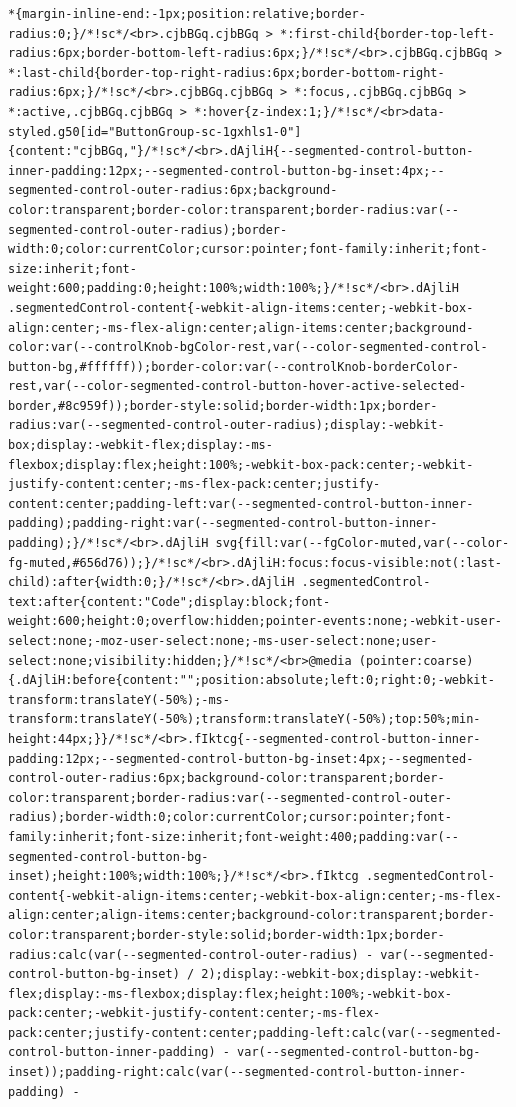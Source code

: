 \documentclass[
  letterpaper,
]{book}
\begin{document}
\begin{verbatim}
*{margin-inline-end:-1px;position:relative;border-radius:0;}/*!sc*/<br>.cjbBGq.cjbBGq > *:first-child{border-top-left-radius:6px;border-bottom-left-radius:6px;}/*!sc*/<br>.cjbBGq.cjbBGq > *:last-child{border-top-right-radius:6px;border-bottom-right-radius:6px;}/*!sc*/<br>.cjbBGq.cjbBGq > *:focus,.cjbBGq.cjbBGq > *:active,.cjbBGq.cjbBGq > *:hover{z-index:1;}/*!sc*/<br>data-styled.g50[id="ButtonGroup-sc-1gxhls1-0"]{content:"cjbBGq,"}/*!sc*/<br>.dAjliH{--segmented-control-button-inner-padding:12px;--segmented-control-button-bg-inset:4px;--segmented-control-outer-radius:6px;background-color:transparent;border-color:transparent;border-radius:var(--segmented-control-outer-radius);border-width:0;color:currentColor;cursor:pointer;font-family:inherit;font-size:inherit;font-weight:600;padding:0;height:100%;width:100%;}/*!sc*/<br>.dAjliH .segmentedControl-content{-webkit-align-items:center;-webkit-box-align:center;-ms-flex-align:center;align-items:center;background-color:var(--controlKnob-bgColor-rest,var(--color-segmented-control-button-bg,#ffffff));border-color:var(--controlKnob-borderColor-rest,var(--color-segmented-control-button-hover-active-selected-border,#8c959f));border-style:solid;border-width:1px;border-radius:var(--segmented-control-outer-radius);display:-webkit-box;display:-webkit-flex;display:-ms-flexbox;display:flex;height:100%;-webkit-box-pack:center;-webkit-justify-content:center;-ms-flex-pack:center;justify-content:center;padding-left:var(--segmented-control-button-inner-padding);padding-right:var(--segmented-control-button-inner-padding);}/*!sc*/<br>.dAjliH svg{fill:var(--fgColor-muted,var(--color-fg-muted,#656d76));}/*!sc*/<br>.dAjliH:focus:focus-visible:not(:last-child):after{width:0;}/*!sc*/<br>.dAjliH .segmentedControl-text:after{content:"Code";display:block;font-weight:600;height:0;overflow:hidden;pointer-events:none;-webkit-user-select:none;-moz-user-select:none;-ms-user-select:none;user-select:none;visibility:hidden;}/*!sc*/<br>@media (pointer:coarse){.dAjliH:before{content:"";position:absolute;left:0;right:0;-webkit-transform:translateY(-50%);-ms-transform:translateY(-50%);transform:translateY(-50%);top:50%;min-height:44px;}}/*!sc*/<br>.fIktcg{--segmented-control-button-inner-padding:12px;--segmented-control-button-bg-inset:4px;--segmented-control-outer-radius:6px;background-color:transparent;border-color:transparent;border-radius:var(--segmented-control-outer-radius);border-width:0;color:currentColor;cursor:pointer;font-family:inherit;font-size:inherit;font-weight:400;padding:var(--segmented-control-button-bg-inset);height:100%;width:100%;}/*!sc*/<br>.fIktcg .segmentedControl-content{-webkit-align-items:center;-webkit-box-align:center;-ms-flex-align:center;align-items:center;background-color:transparent;border-color:transparent;border-style:solid;border-width:1px;border-radius:calc(var(--segmented-control-outer-radius) - var(--segmented-control-button-bg-inset) / 2);display:-webkit-box;display:-webkit-flex;display:-ms-flexbox;display:flex;height:100%;-webkit-box-pack:center;-webkit-justify-content:center;-ms-flex-pack:center;justify-content:center;padding-left:calc(var(--segmented-control-button-inner-padding) - var(--segmented-control-button-bg-inset));padding-right:calc(var(--segmented-control-button-inner-padding) - 
\end{verbatim}
\end{document}
